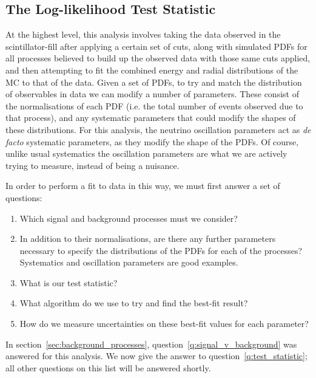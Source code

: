 \subsection{The Log-likelihood Test Statistic}\label{sec:test_statistic}
At the highest level, this analysis involves taking the data observed in the scintillator-fill after applying a certain set of cuts, along with simulated PDFs for all processes believed to build up the observed data with those same cuts applied, and then attempting to fit the combined energy and radial distributions of the MC to that of the data. Given a set of PDFs, to try and match the distribution of observables in data we can modify a number of parameters. These consist of the normalisations of each PDF (i.e. the total number of events observed due to that process), and any systematic parameters that could modify the shapes of these distributions. For this analysis, the neutrino oscillation parameters act as \textit{de facto} systematic parameters, as they modify the shape of the \beight{} PDFs. Of course, unlike usual systematics the oscillation parameters are what we are actively trying to measure, instead of being a nuisance.

In order to perform a fit to data in this way, we must first answer a set of questions:
\begin{enumerate}
    \item Which signal and background processes must we consider?\label{q:signal_v_background}
    \item In addition to their normalisations, are there any further parameters necessary to specify the distributions of the PDFs for each of the processes? Systematics and oscillation parameters are good examples.
    \item What is our test statistic?\label{q:test_statistic}
    \item What algorithm do we use to try and find the best-fit result?\label{q:algorithm}
    \item How do we measure uncertainties on these best-fit values for each parameter?\label{q:uncertainty}
\end{enumerate}
In section~\ref{sec:background_processes}, question~\ref{q:signal_v_background} was answered for this analysis. We now give the answer to question~\ref{q:test_statistic}; all other questions on this list will be answered shortly.

